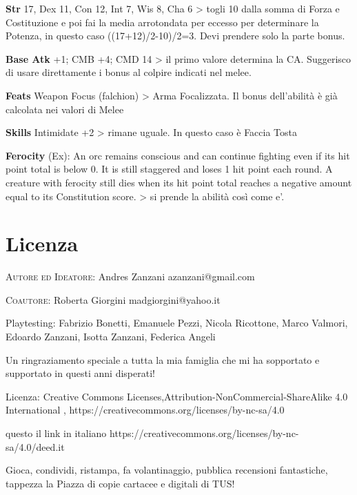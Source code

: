 \documentclass[a4paper,11pt,twoside,openany]{book}
\begin{document}
\textbf{Str} 17, Dex 11, Con 12, Int 7, Wis 8, Cha 6 \textgreater{} togli 10 dalla somma di Forza e Costituzione e poi fai la media arrotondata per eccesso per determinare la Potenza, in questo caso ((17+12)/2-10)/2=3. Devi prendere solo la parte bonus.

\textbf{Base Atk} +1; CMB +4; CMD 14 \textgreater{} il primo valore determina la CA. Suggerisco di usare direttamente i bonus al colpire indicati nel melee.

\textbf{Feats} Weapon Focus (falchion) \textgreater{} Arma Focalizzata. Il bonus dell'abilità è già calcolata nei valori di Melee

\textbf{Skills} Intimidate +2 \textgreater{} rimane uguale. In questo caso è Faccia Tosta

\textbf{Ferocity} (Ex): An orc remains conscious and can continue fighting even if its hit point total is below 0. It is still staggered and loses 1 hit point each round. A creature with ferocity still dies when its hit point total reaches a negative amount equal to its Constitution score. \textgreater{} si prende la abilità così come e'.

\pagebreak

\section{Licenza}

\bigskip

\textsc{Autore ed Ideatore}: Andres Zanzani azanzani@gmail.com

\bigskip
\textsc{Coautore}: Roberta Giorgini madgiorgini@yahoo.it

\bigskip

Playtesting: Fabrizio Bonetti, Emanuele Pezzi, Nicola Ricottone, Marco Valmori, Edoardo Zanzani, Isotta Zanzani, Federica Angeli

\bigskip

Un ringraziamento speciale a tutta la mia famiglia che mi ha sopportato e supportato in questi anni disperati!

\bigskip

Licenza: Creative Commons Licenses,Attribution-NonCommercial-ShareAlike 4.0 International , https://creativecommons.org/licenses/by-nc-sa/4.0

questo il link in italiano https://creativecommons.org/licenses/by-nc-sa/4.0/deed.it

Gioca, condividi, ristampa, fa volantinaggio, pubblica recensioni fantastiche, tappezza la Piazza di copie cartacee e digitali di TUS!
\end{document}
